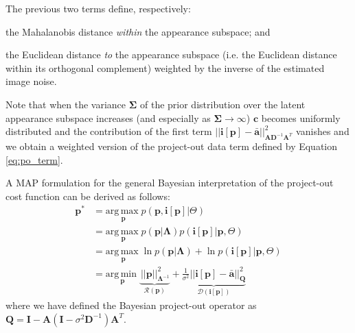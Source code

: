 The previous two terms define, respectively: 
\begin{inparaenum}
\item the Mahalanobis distance \emph{within} the appearance subspace; and 
\item the Euclidean distance \emph{to} the appearance subspace (i.e. the Euclidean distance within its orthogonal complement) weighted by the inverse of the estimated image noise.
\end{inparaenum} 
Note that when the variance $\mathbf{\Sigma}$ of the prior distribution over the latent appearance subspace increases (and especially as
$\mathbf{\Sigma} \rightarrow \infty$) $\mathbf{c}$ becomes uniformly distributed and the contribution of the first term $|| \mathbf{i}[\mathbf{p}] - \mathbf{\bar{a}} ||^2_{\mathbf{A}\mathbf{D}^{-1}\mathbf{A}^T}$ vanishes and we obtain a weighted version of the project-out data term defined by Equation \ref{eq:po_term}. 

A MAP formulation for the general Bayesian interpretation of the project-out cost function can be derived as follows:
\begin{equation}
    \begin{aligned}
        \mathbf{p}^* & = \underset{\mathbf{p}}{\mathrm{arg\,max\;}} p(\mathbf{p}, \mathbf{i}[\mathbf{p}] | \Theta) 
        \\
        & = \underset{\mathbf{p}}{\mathrm{arg\,max\;}}  p(\mathbf{p} | \mathbf{\Lambda})  p(\mathbf{i}[\mathbf{p}] |
        \mathbf{p}, \Theta)  
        \\
        & = \underset{\mathbf{p}}{\mathrm{arg\,max\;}}  \ln p(\mathbf{p} | \mathbf{\Lambda}) + \ln p(\mathbf{i}[\mathbf{p}] | \mathbf{p}, \Theta)
        \\
        & = \underset{\mathbf{p}}{\mathrm{arg\,min\;}}  \underbrace{\frac{}{} ||\mathbf{p}||^2_{\mathbf{\Lambda}^{-1}}}_{\mathcal{R}(\mathbf{p})} + \underbrace{\frac{1}{\sigma^2}|| \mathbf{i}[\mathbf{p}] - \mathbf{\bar{a}} ||^2_{\mathbf{Q}}}_{\mathcal{D}(\mathbf{i}[\mathbf{p}])}
    \end{aligned}
    \label{eq:prob_rpo}
\end{equation}
where we have defined the Bayesian project-out operator as $\mathbf{Q} = \mathbf{I} - \mathbf{A}(\mathbf{I} - \sigma^2\mathbf{D}^{-1})\mathbf{A}^T$.
